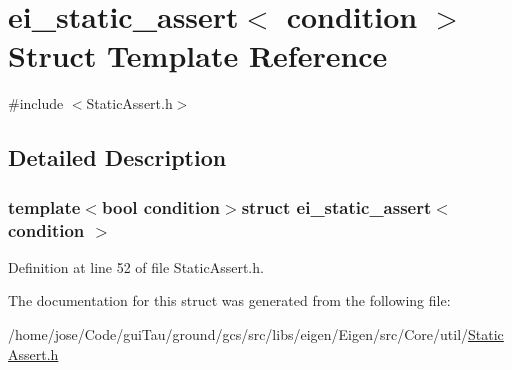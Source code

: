 \hypertarget{structei__static__assert}{\section{ei\-\_\-static\-\_\-assert$<$ condition $>$ Struct Template Reference}
\label{structei__static__assert}
}


{\ttfamily \#include $<$Static\-Assert.\-h$>$}



\subsection{Detailed Description}
\subsubsection*{template$<$bool condition$>$struct ei\-\_\-static\-\_\-assert$<$ condition $>$}



Definition at line 52 of file Static\-Assert.\-h.



The documentation for this struct was generated from the following file\-:\begin{DoxyCompactItemize}
\item 
/home/jose/\-Code/gui\-Tau/ground/gcs/src/libs/eigen/\-Eigen/src/\-Core/util/\hyperlink{_static_assert_8h}{Static\-Assert.\-h}\end{DoxyCompactItemize}
